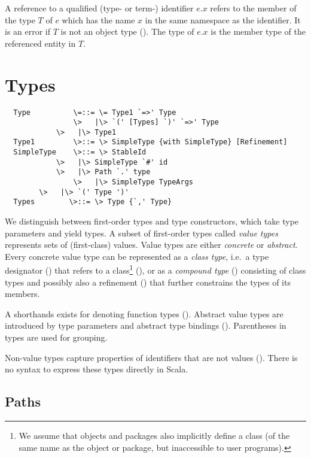 \documentclass[11pt]{report}
\begin{document}
A reference to a qualified (type- or term-) identifier $e.x$ refers to
the member of the type $T$ of $e$ which has the name $x$ in the same
namespace as the identifier. It is an error if $T$ is not an object type
(). The type of $e.x$ is the member type of the
referenced entity in $T$.

\chapter{\label{sec:types}Types}

\syntax\begin{verbatim}
  Type          \=::= \= Type1 `=>' Type
                \>   |\> `(' [Types] `)' `=>' Type
	        \>   |\> Type1
  Type1         \>::= \> SimpleType {with SimpleType} [Refinement]
  SimpleType   	\>::= \> StableId
	        \>   |\> SimpleType `#' id
	        \>   |\> Path `.' type
                \>   |\> SimpleType TypeArgs
		\>   |\> `(' Type ')'
  Types	       \>::= \> Type {`,' Type}
\end{verbatim}

We distinguish between first-order types and type constructors, which
take type parameters and yield types. A subset of first-order types
called {\em value types} represents sets of (first-class) values.
Value types are either {\em concrete} or {\em abstract}. Every
concrete value type can be represented as a {\em class type}, i.e.\ a
type designator () that refers to a 
class\footnote{We assume that objects and packages also
implicitly define a class (of the same name as the object or package,
but inaccessible to user programs).} (), 
or as a {\em compound type} () 
consisting of class types and possibly
also a refinement () that further constrains the
types of its members.

A shorthands exists for denoting function types
().  Abstract value types are introduced by
type parameters and abstract type bindings ().
Parentheses in types are used for grouping.

Non-value types capture properties of
identifiers that are not values
().  There is no syntax to express these
types directly in Scala.

\section{Paths}\label{sec:paths}
\end{document}
